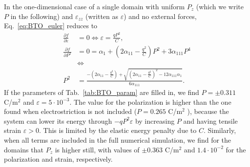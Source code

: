 In the one-dimensional case of a single domain with uniform $P_z$ (which we write $P$ in the following) and $\varepsilon_{zz}$ (written as $\varepsilon$) and no external forces, Eq.~\eqref{eq:BTO_euler} reduces to  
\begin{align}
	\frac{\partial f}{\partial \varepsilon} &= 0 \Leftrightarrow \varepsilon = \frac{qP^2}{C}\label{eq:BTO_e0},\\
	\frac{\partial f}{\partial P^2} &= 0 = \alpha_1 + (2 \alpha_{11} - \frac{q^2}{C})P^2 + 3\alpha_{111}P^4 \\
	& \Leftrightarrow \\
	P^2 &= \frac{-(2\alpha_{11} - \frac{q^2}{C}) + \sqrt{(2\alpha_{11}-\frac{q^2}{C})^2 - 12 \alpha_{111} \alpha_1}}{6\alpha_{111}}.
\end{align}
If the parameters of Tab.~\ref{tab:BTO_param} are filled in, we find $P = \pm 0.311$ C/m$^2$ and $\varepsilon = 5 \cdot 10^{-3}$.
The value for the polarization is higher than the one found when electrostriction is not included ($P = 0.265$ C/m$^2$ \cite{Marton2010}), because the system can lower its energy through $-qP^2\varepsilon$ by increasing $P$ and having tensile strain $\varepsilon > 0$. This is limited by the elastic energy penalty due to $C$.
Similarly, when all terms are included in the full numerical simulation, we find for the domains that $P_z$ is higher still, with values of $\pm 0.363$ C/m$^2$ and $1.4 \cdot 10^{-2}$ for the polarization and strain, respectively.

